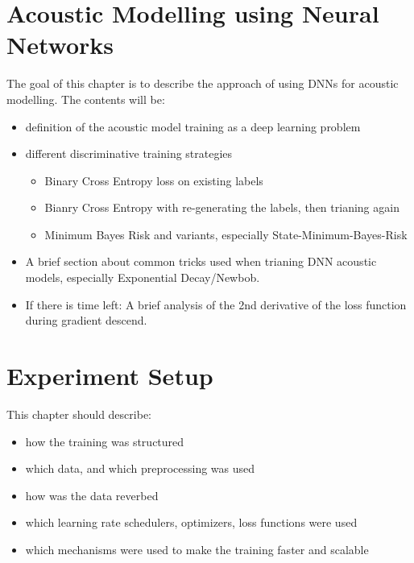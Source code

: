 \chapter{Acoustic Modelling using Neural Networks}
\label{ch:acoustic_modelling}
The goal of this chapter is to describe the approach of using DNNs for acoustic modelling.
The contents will be: 
\begin{itemize}
    \item definition of the acoustic model training as a deep learning problem
    \item different discriminative training strategies
    \begin{itemize}
        \item Binary Cross Entropy loss on existing labels
        \item Bianry Cross Entropy with re-generating the labels, then trianing again
        \item Minimum Bayes Risk and variants, especially State-Minimum-Bayes-Risk
    \end{itemize}
    \item A brief section about common tricks used when trianing DNN acoustic models, 
          especially Exponential Decay/Newbob.
    \item If there is time left: A brief analysis of the 2nd derivative of the loss function
    during gradient descend.
\end{itemize}

\chapter{Experiment Setup}
\label{ch:experiment_setup}
This chapter should describe:
\begin{itemize}
    \item how the training was structured
    \item which data, and which preprocessing was used
    \item how was the data reverbed
    \item which learning rate schedulers, optimizers, loss functions were used
    \item which mechanisms were used to make the training faster and scalable
\end{itemize}
